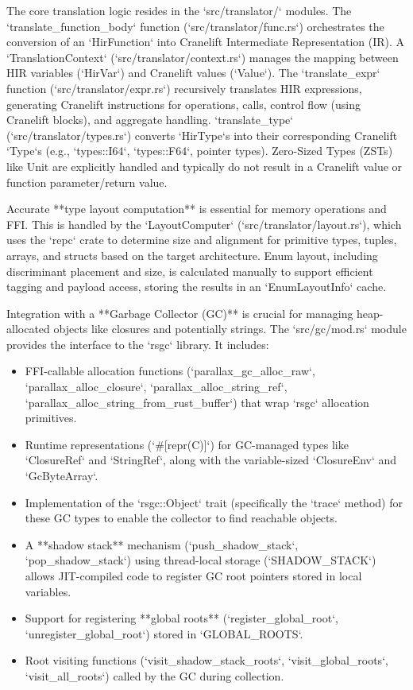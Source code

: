 The core translation logic resides in the `src/translator/` modules. The `translate_function_body` function (`src/translator/func.rs`) orchestrates the conversion of an `HirFunction` into Cranelift Intermediate Representation (IR). A `TranslationContext` (`src/translator/context.rs`) manages the mapping between HIR variables (`HirVar`) and Cranelift values (`Value`). The `translate_expr` function (`src/translator/expr.rs`) recursively translates HIR expressions, generating Cranelift instructions for operations, calls, control flow (using Cranelift blocks), and aggregate handling. `translate_type` (`src/translator/types.rs`) converts `HirType`s into their corresponding Cranelift `Type`s (e.g., `types::I64`, `types::F64`, pointer types). Zero-Sized Types (ZSTs) like Unit are explicitly handled and typically do not result in a Cranelift value or function parameter/return value.

Accurate **type layout computation** is essential for memory operations and FFI. This is handled by the `LayoutComputer` (`src/translator/layout.rs`), which uses the `repc` crate to determine size and alignment for primitive types, tuples, arrays, and structs based on the target architecture. Enum layout, including discriminant placement and size, is calculated manually to support efficient tagging and payload access, storing the results in an `EnumLayoutInfo` cache.

Integration with a **Garbage Collector (GC)** is crucial for managing heap-allocated objects like closures and potentially strings. The `src/gc/mod.rs` module provides the interface to the `rsgc` library. It includes:
\begin{itemize}
    \item FFI-callable allocation functions (`parallax_gc_alloc_raw`, `parallax_alloc_closure`, `parallax_alloc_string_ref`, `parallax_alloc_string_from_rust_buffer`) that wrap `rsgc` allocation primitives.
    \item Runtime representations (`#[repr(C)]`) for GC-managed types like `ClosureRef` and `StringRef`, along with the variable-sized `ClosureEnv` and `GcByteArray`.
    \item Implementation of the `rsgc::Object` trait (specifically the `trace` method) for these GC types to enable the collector to find reachable objects.
    \item A **shadow stack** mechanism (`push_shadow_stack`, `pop_shadow_stack`) using thread-local storage (`SHADOW_STACK`) allows JIT-compiled code to register GC root pointers stored in local variables.
    \item Support for registering **global roots** (`register_global_root`, `unregister_global_root`) stored in `GLOBAL_ROOTS`.
    \item Root visiting functions (`visit_shadow_stack_roots`, `visit_global_roots`, `visit_all_roots`) called by the GC during collection.
\end{itemize}

